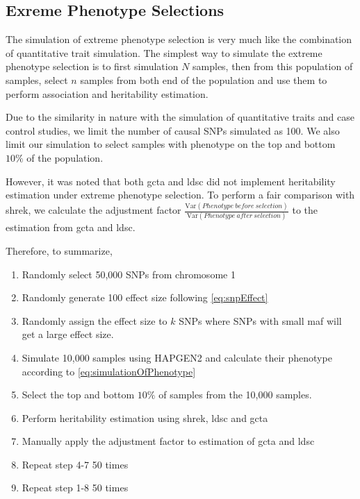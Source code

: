 		\subsection{Exreme Phenotype Selections}
		The simulation of extreme phenotype selection is very much like the combination of quantitative trait simulation. 
		The simplest way to simulate the extreme phenotype selection is to first simulation $N$ samples, then from this population of samples, select $n$ samples from both end of the population and use them to perform association and heritability estimation.
		
		Due to the similarity in nature with the simulation of quantitative traits and case control studies, we limit the number of causal \glspl{SNP} simulated as 100. 
		We also limit our simulation to select samples with phenotype on the top and bottom $10\%$ of the population.
		
		However, it was noted that both \gls{gcta} and \gls{ldsc} did not implement heritability estimation under extreme phenotype selection. 
		To perform a fair comparison with \gls{shrek}, we calculate the adjustment factor $\frac{\mathrm{Var}(Phenotype\ before\ selection)}{\mathrm{Var}(Phenotype\ after\ selection)}$ to the estimation from \gls{gcta} and \gls{ldsc}.
		
		Therefore, to summarize,
		\begin{enumerate}
			\item Randomly select 50,000 \glspl{SNP} from chromosome 1
			\item Randomly generate 100 effect size following \cref{eq:snpEffect}
			\item Randomly assign the effect size to $k$ \glspl{SNP} where \glspl{SNP} with small \gls{maf} will get a large effect size.
			\item Simulate 10,000 samples using HAPGEN2 and calculate their phenotype according to \cref{eq:simulationOfPhenotype}
			\item Select the top and bottom $10\%$ of samples from the 10,000 samples.
			\item Perform heritability estimation using \gls{shrek}, \gls{ldsc} and  \gls{gcta}
			\item Manually apply the adjustment factor to estimation of \gls{gcta} and \gls{ldsc}
			\item Repeat step 4-7 50 times
			\item Repeat step 1-8 50 times
		\end{enumerate}
		
